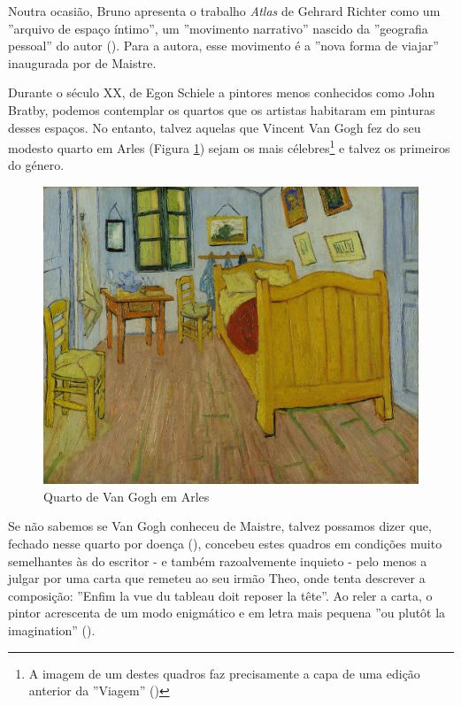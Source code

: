 \documentclass[12pt]{article}
\begin{document}
Noutra ocasião, Bruno apresenta o trabalho \emph{Atlas} de Gehrard
Richter como um ''arquivo de espaço íntimo'', um ''movimento
narrativo'' nascido da ''geografia pessoal'' do autor
(\cite[p.334]{bruno2002atlas}). Para a autora, esse movimento é a
''nova forma de viajar'' inaugurada por de Maistre.

Durante o século XX, de Egon Schiele a pintores menos conhecidos como
John Bratby, podemos contemplar os quartos que os artistas habitaram
em pinturas desses espaços. No entanto, talvez aquelas que Vincent Van
Gogh fez do seu modesto quarto em Arles (Figura \ref{fig:1}) sejam os
mais célebres\footnote{A imagem de um destes quadros faz precisamente
  a capa de uma edição anterior da ''Viagem'' (\cite{hedra})} e talvez
os primeiros do género.

\begin{figure}
  \centering\includegraphics[height=0.4\textheight,keepaspectratio] {slaapkamer.jpg}
  \caption{Quarto de Van Gogh em Arles}
  \label{fig:1}
\end{figure}

Se não sabemos se Van Gogh conheceu de Maistre, talvez possamos dizer
que, fechado nesse quarto por doença (\cite{goghroom}), concebeu estes
quadros em condições muito semelhantes às do escritor - e também
razoalvemente inquieto - pelo menos a julgar por uma carta que remeteu
ao seu irmão Theo, onde tenta descrever a composição: ''Enfim la vue
du tableau doit reposer la tête''. Ao reler a carta, o pintor
acrescenta de um modo enigmático e em letra mais pequena ''ou plutôt
la imagination'' (\cite{goghcarta}).
\end{document}
